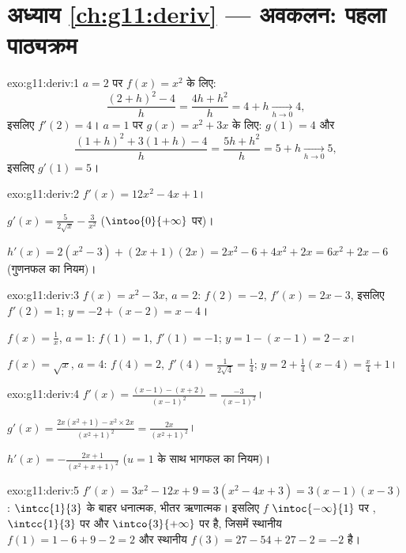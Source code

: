 \section*{अध्याय \ref{ch:g11:deriv} --- अवकलन: पहला पाठ्यक्रम}

\begin{solution}{exo:g11:deriv:1}
$a = 2$ पर $f(x) = x^2$ के लिए:
\[
\frac{(2+h)^2 - 4}{h} = \frac{4h + h^2}{h} = 4 + h
\xrightarrow[h\to0]{} 4,
\]
इसलिए $f'(2) = 4$। $a = 1$ पर $g(x) = x^2 + 3x$ के लिए: $g(1) = 4$ और
\[
\frac{(1+h)^2 + 3(1+h) - 4}{h} = \frac{5h + h^2}{h} = 5 + h
\xrightarrow[h\to0]{} 5,
\]
इसलिए $g'(1) = 5$।
\end{solution}

\begin{solution}{exo:g11:deriv:2}
$f'(x) = 12x^2 - 4x + 1$।

$g'(x) = \frac{5}{2\sqrt x} - \frac{3}{x^2}$ ($\intoo{0}{+\infty}$ पर)।

$h'(x) = 2(x^2 - 3) + (2x+1)(2x) = 2x^2 - 6 + 4x^2 + 2x
= 6x^2 + 2x - 6$ (गुणनफल का नियम)।
\end{solution}

\begin{solution}{exo:g11:deriv:3}
$f(x) = x^2 - 3x$, $a = 2$: $f(2) = -2$, $f'(x) = 2x - 3$, इसलिए $f'(2) = 1$;  $y = -2 + (x - 2) = x - 4$।

$f(x) = \frac1x$, $a = 1$: $f(1) = 1$, $f'(1) = -1$;  $y = 1 - (x - 1) = 2 - x$।

$f(x) = \sqrt x$, $a = 4$: $f(4) = 2$, $f'(4) = \frac{1}{2\sqrt4} =
\frac14$;  $y = 2 + \frac14(x - 4) = \frac{x}{4} + 1$।
\end{solution}

\begin{solution}{exo:g11:deriv:4}
$f'(x) = \frac{(x-1) - (x+2)}{(x-1)^2} = \frac{-3}{(x-1)^2}$।

$g'(x) = \frac{2x(x^2+1) - x^2 \times 2x}{(x^2+1)^2}
= \frac{2x}{(x^2+1)^2}$।

$h'(x) = -\frac{2x+1}{(x^2+x+1)^2}$ ($u = 1$ के साथ भागफल का नियम)।
\end{solution}

\begin{solution}{exo:g11:deriv:5}
$f'(x) = 3x^2 - 12x + 9 = 3(x^2 - 4x + 3) = 3(x-1)(x-3)$: $\intcc{1}{3}$ के बाहर धनात्मक, भीतर ऋणात्मक। इसलिए $f$ $\intoc{-\infty}{1}$ पर , $\intcc{1}{3}$
पर  और $\intco{3}{+\infty}$ पर  है, जिसमें स्थानीय  $f(1) = 1 - 6 + 9 - 2 = 2$ और स्थानीय
 $f(3) = 27 - 54 + 27 - 2 = -2$ है।
\end{solution}

